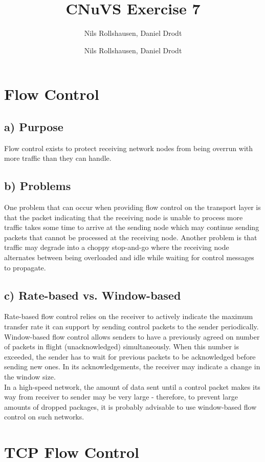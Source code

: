 \documentclass[a4paper, 11 pt, article, accentcolor=tud7b]{tudreport}
\title{CNuVS Exercise 7}
\author{Nils Rollshausen, Daniel Drodt}
\subtitle{Nils Rollshausen, Daniel Drodt}
\begin{document}
	\maketitle
	\section{Flow Control}
	\subsection*{a) Purpose}
	Flow control exists to protect receiving network nodes from being overrun with more traffic than they can handle.
	  
	\subsection*{b) Problems}
	One problem that can occur when providing flow control on the transport layer is that the packet indicating that the receiving node is unable to process more traffic takes some time to arrive at the sending node which may continue sending packets that cannot be processed at the receiving node. Another problem is that traffic may degrade into a choppy stop-and-go where the receiving node alternates between being overloaded and idle while waiting for control messages to propagate.
	
	\subsection*{c) Rate-based vs. Window-based}
	Rate-based flow control relies on the receiver to actively indicate the maximum transfer rate it can support by sending control packets to the sender periodically. Window-based flow control allows senders to have a previously agreed on number of packets in flight (unacknowledged) simultaneously. When this number is exceeded, the sender has to wait for previous packets to be acknowledged before sending new ones. In its acknowledgements, the receiver may indicate a change in the window size. \\
	In a high-speed network, the amount of data sent until a control packet makes its way from receiver to sender may be very large - therefore, to prevent large amounts of dropped packages, it is probably advisable to use window-based flow control on such networks.

	\section{TCP Flow Control}
\end{document}
